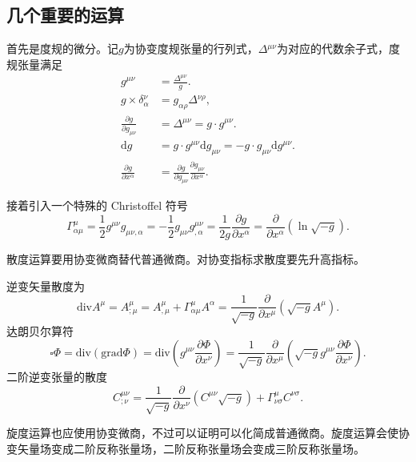 \documentclass[11pt, a4paper, oneside, onecolumn]{ctexart}
\numberwithin{equation}{subsection}
\begin{document}
\subsection{几个重要的运算}
首先是度规的微分。记$g$为协变度规张量的行列式，$\Delta{}^{\mu\nu}$为对应的代数余子式，度规张量满足
\begin{align}
g^{\mu\nu}&=\frac{\Delta{}^{\mu\nu}}{g}.\\
g\times\delta{}_{\alpha}^{\nu}&=g_{\alpha\rho}\Delta{}^{\nu\rho},\\
\frac{\partial{}g}{\partial{}g_{\mu\nu}}&=\Delta{}^{\mu\nu}=g\cdot g^{\mu\nu}.\\
\mathrm{d}g&=g\cdot g^{\mu\nu}\mathrm{d}g_{\mu\nu}=-g\cdot g_{\mu\nu}\mathrm{d}g^{\mu\nu}.\\
\frac{\partial{}g}{\partial{}x^{\alpha}}&=\frac{\partial{}g}{\partial{}g_{\mu\nu}}\frac{\partial{}g_{\mu\nu}}{\partial{}x^{\alpha}}.
\end{align}

接着引入一个特殊的 Christoffel 符号
\begin{equation}
\Gamma_{\alpha\mu}^{\mu}=\frac12g^{\mu\nu}g_{\mu\nu,\alpha}=-\frac{1}{2}g_{\mu\nu}g^{\mu\nu}_{,\alpha}=\frac{1}{2g}\frac{\partial{}g}{\partial{}x^{\alpha}}=\frac{\partial{}}{\partial{}x^{\alpha}}\left(\ln\sqrt{-g}\right).\label{1.10.6}
\end{equation}

散度运算要用协变微商替代普通微商。对协变指标求散度要先升高指标。

逆变矢量散度为
\begin{equation}
\text{div}A^{\mu}=A^{\mu}_{;\mu}=A^{\mu}_{,\mu}+\Gamma^{\mu}_{\alpha\mu}A^{\alpha}=\frac{1}{\sqrt{-g}}\frac{\partial{}}{\partial{}x^{\mu}}\left(\sqrt{-g}A^{\mu}\right).
\end{equation}
达朗贝尔算符
\begin{equation}
\square\Phi=\text{div}\left(\text{grad}\Phi\right)=\text{div}\left(g^{\mu\nu}\frac{\partial{}\Phi}{\partial{}x^{\nu}}\right)=\frac{1}{\sqrt{-g}}\frac{\partial{}}{\partial{}x^{\mu}}\left(\sqrt{-g}g^{\mu\nu}\frac{\partial{}\Phi}{\partial{}x^{\nu}}\right).
\end{equation}
二阶逆变张量的散度
\begin{equation}
C^{\mu\nu}_{;\nu}=\frac{1}{\sqrt{-g}}\frac{\partial{}}{\partial{}x^{\nu}}\left(C^{\mu\nu}\sqrt{-g}\right)+\Gamma_{\nu\sigma}^{\mu}C^{\nu\sigma}.
\end{equation}

旋度运算也应使用协变微商，不过可以证明可以化简成普通微商。旋度运算会使协变矢量场变成二阶反称张量场，二阶反称张量场会变成三阶反称张量场。
\end{document}
